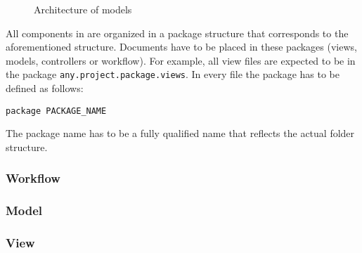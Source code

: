 
\begin{figure}[htb!]
\centering
{}
\caption{Architecture of \MD models}
\label{fig:MD2Arch}
\end{figure}

All components in \MD are organized in a package structure that corresponds to the aforementioned structure. Documents have to be placed in these packages (views, models, controllers or workflow). For example, all view files are expected to be in the package \lstinline[language=Simple]|any.project.package.views|. In every \MD file the package has to be defined as follows:
\begin{lstlisting}
package PACKAGE_NAME
\end{lstlisting}
The package name has to be a fully qualified name that reflects the actual folder structure.

\subsubsection{Workflow} 
\label{subsubsec:Workflow}


\subsubsection{Model} 
\label{subsubsec:Model}


\subsubsection{View} 
\label{subsubsec:View}



